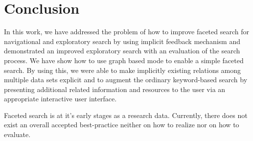 \chapter{Conclusion}
\label{conclusion}

In this work, we have addressed the problem of how to improve faceted search for navigational and exploratory search by using implicit feedback mechanism and demonstrated an improved exploratory search with an evaluation of the search process. We have show how to use graph based mode to enable a simple faceted search. By using this, we were able to make implicitly existing relations among multiple data sets explicit and to augment the ordinary keyword-based search by presenting additional related information and resources to the user via an appropriate interactive user interface.

Faceted search is at it's early stages as a research data. Currently, there does not exist an overall accepted best-practice neither on how to realize nor on how to evaluate. 